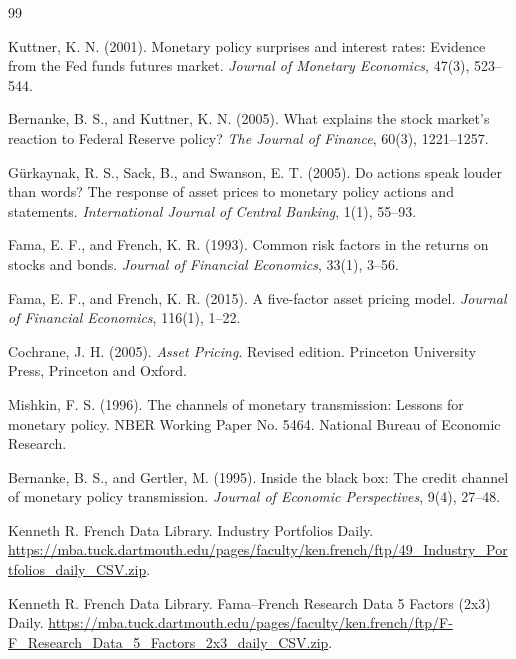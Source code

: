 \documentclass[UTF8,zihao=-4]{ctexart}
\begin{document}
\begin{thebibliography}{99}

Kuttner, K. N. (2001).
Monetary policy surprises and interest rates: Evidence from the Fed funds futures market.
\textit{Journal of Monetary Economics}, 47(3), 523--544.

Bernanke, B. S., and Kuttner, K. N. (2005).
What explains the stock market's reaction to Federal Reserve policy?
\textit{The Journal of Finance}, 60(3), 1221--1257.

G{\"u}rkaynak, R. S., Sack, B., and Swanson, E. T. (2005).
Do actions speak louder than words? The response of asset prices to monetary policy actions and statements.
\textit{International Journal of Central Banking}, 1(1), 55--93.

Fama, E. F., and French, K. R. (1993).
Common risk factors in the returns on stocks and bonds.
\textit{Journal of Financial Economics}, 33(1), 3--56.

Fama, E. F., and French, K. R. (2015).
A five-factor asset pricing model.
\textit{Journal of Financial Economics}, 116(1), 1--22.

Cochrane, J. H. (2005).
\newblock \textit{Asset Pricing}.
\newblock Revised edition. Princeton University Press, Princeton and Oxford.

Mishkin, F. S. (1996).
\newblock The channels of monetary transmission: Lessons for monetary policy.
\newblock NBER Working Paper No. 5464. National Bureau of Economic Research.

Bernanke, B. S., and Gertler, M. (1995).
\newblock Inside the black box: The credit channel of monetary policy transmission.
\newblock \textit{Journal of Economic Perspectives}, 9(4), 27--48.

Kenneth R. French Data Library.
 Industry Portfolios Daily.
\newblock \url{https://mba.tuck.dartmouth.edu/pages/faculty/ken.french/ftp/49_Industry_Portfolios_daily_CSV.zip}.

Kenneth R. French Data Library.
\newblock Fama--French Research Data 5 Factors (2x3) Daily.
\newblock \url{https://mba.tuck.dartmouth.edu/pages/faculty/ken.french/ftp/F-F_Research_Data_5_Factors_2x3_daily_CSV.zip}.


\end{thebibliography}
\end{document}
